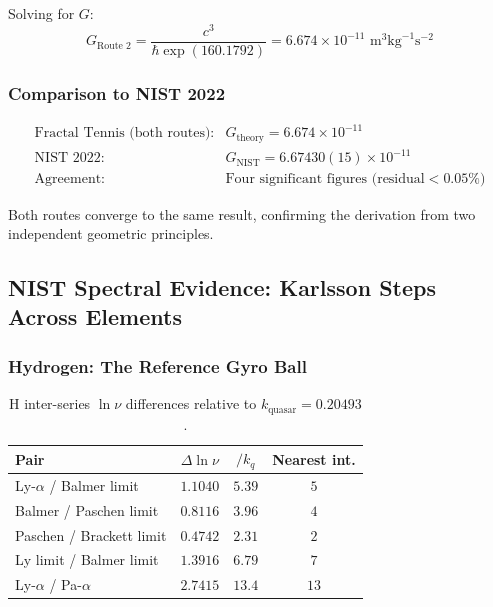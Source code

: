 \documentclass[11pt,a4paper]{article}
\begin{document}
\noindent Solving for $G$:
\begin{equation}
  G_{\text{Route 2}} = \frac{c^3}{\hbar \exp(160.1792)} = 6.674 \times 10^{-11}
  \text{ m}^3\text{kg}^{-1}\text{s}^{-2}
\end{equation}

\subsubsection{Comparison to NIST 2022}

\begin{equation}
\begin{array}{ll}
\text{Fractal Tennis (both routes):} & G_{\text{theory}} = 6.674 \times 10^{-11} \\
\text{NIST 2022:} & G_{\text{NIST}} = 6.67430(15) \times 10^{-11} \\
\text{Agreement:} & \text{Four significant figures (residual} < 0.05\%)
\end{array}
\end{equation}

Both routes converge to the same result, confirming the derivation from two
independent geometric principles.

\subsection{NIST Spectral Evidence: Karlsson Steps Across Elements}

\subsubsection{Hydrogen: The Reference Gyro Ball}

\begin{table}[h]
\centering\small
\begin{tabular}{|l|c|c|c|}
\hline
\textbf{Pair} & \textbf{$\Delta\ln\nu$} & \textbf{$/k_q$} & \textbf{Nearest int.} \\
\hline
Ly-$\alpha$ / Balmer limit & $1.1040$ & $5.39$ & $5$ \\
Balmer / Paschen limit & $0.8116$ & $3.96$ & $4$ \\
Paschen / Brackett limit & $0.4742$ & $2.31$ & $2$ \\
Ly limit / Balmer limit & $1.3916$ & $6.79$ & $7$ \\
Ly-$\alpha$ / Pa-$\alpha$ & $2.7415$ & $13.4$ & $13$ \\
\hline
\end{tabular}
\caption{H inter-series $\ln\nu$ differences relative to $k_{\text{quasar}}=0.20493$.}
\end{table}
\end{document}
